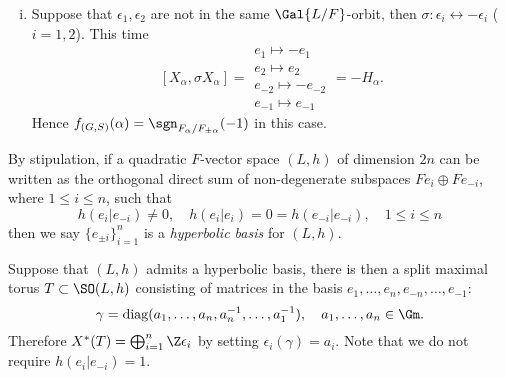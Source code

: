 \documentclass[a4paper,10pt]{article}
\begin{document}
\begin{asparaenum}
\begin{enumerate}[(i)]
		\item Suppose that $\epsilon_1, \epsilon_2$ are not in the same $\Gal{L/F}$-orbit, then $\sigma: \epsilon_i \leftrightarrow -\epsilon_i$ ($i=1,2$). This time
		\[ [X_\alpha, \sigma X_\alpha] = \begin{array}{l}
			e_1 \mapsto -e_1 \\
			e_2 \mapsto e_2 \\
			e_{-2} \mapsto -e_{-2} \\
			e_{-1} \mapsto e_{-1}
		\end{array} = -H_\alpha. \]
		Hence $f_{(G,S)}(\alpha) = \sgn_{F_\alpha/F_{\pm\alpha}}(-1)$ in this case.
	\end{enumerate}
\end{asparaenum}

\begin{definition}\label{def:hyperbolic-basis}
	By stipulation, if a quadratic $F$-vector space $(L,h)$ of dimension $2n$ can be written as the orthogonal direct sum of non-degenerate subspaces $Fe_i \oplus Fe_{-i}$, where $1 \leq i \leq n$, such that
	\[ h(e_i|e_{-i}) \neq 0, \quad h(e_i|e_i) = 0 = h(e_{-i}|e_{-i}), \quad 1 \leq i \leq n \]
	then we say $\{e_{\pm i}\}_{i=1}^n$ is a \emph{hyperbolic basis} for $(L,h)$.
\end{definition}
Suppose that $(L,h)$ admits a hyperbolic basis, there is then a split maximal torus $T \subset \SO(L,h)$ consisting of matrices in the basis $e_1, \ldots, e_n, e_{-n}, \ldots, e_{-1}$:
\[ \gamma = \text{diag}(a_1, \ldots, a_n, a_n^{-1}, \ldots, a_1^{-1}), \quad a_1, \ldots, a_n \in \Gm. \]
Therefore $X^*(T) = \bigoplus_{i=1}^n \Z\epsilon_i$ by setting $\epsilon_i(\gamma) = a_i$. Note that we do not require $h(e_i|e_{-i}) = 1$.
\end{document}
